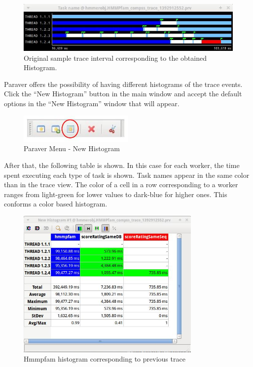 \begin{figure}[ht!]
  \centering
    \includegraphics[width=1.0\textwidth]{./Sections/5_Analysis/Figures/11.jpeg}
    \caption{Original sample trace interval corresponding to the obtained Histogram.}
\end{figure} 
 
Paraver offers the possibility of having different histograms of the trace events. 
Click the ``New Histogram'' button in the main window and accept the 
default options in the ``New Histogram'' window that will appear.

\begin{figure}[ht!]
  \centering
    \includegraphics[width=0.5\textwidth]{./Sections/5_Analysis/Figures/12.jpeg}
    \caption{Paraver Menu - New Histogram}
\end{figure}

After that, the following table is shown. In this case for each worker, the time spent 
executing each type of task is shown. Task names appear in the same color than in the 
trace view. The color of a cell in a row corresponding to a worker ranges from 
light-green for lower values to dark-blue for higher ones. This conforms a color based histogram.

\begin{figure}[ht!]
  \centering
    \includegraphics[width=0.8\textwidth]{./Sections/5_Analysis/Figures/13.jpeg}
    \caption{Hmmpfam histogram corresponding to previous trace}
\end{figure}
 
